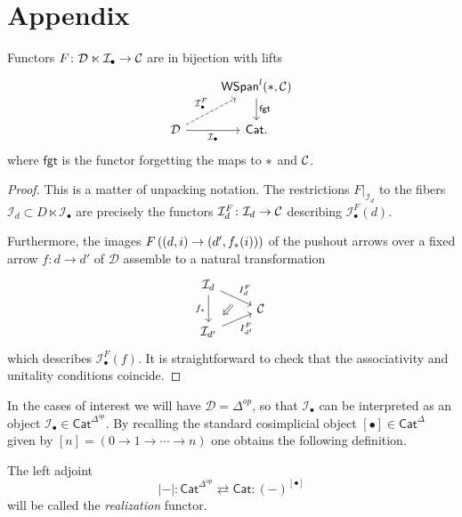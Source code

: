 \documentclass[a4paper,10pt]{article}%
\begin{document}
\appendix
\section{Appendix}


\begin{lemma}\label{SIMPSPANREIN LEMMA}
Functors $F \colon \mathcal{D} \ltimes \mathcal{I}_{\bullet} \to \mathcal{C}$ are in bijection with lifts
\[
\begin{tikzcd}
    & \mathsf{WSpan}^l(\**,\C) \ar{d}{\mathsf{fgt}} \\
\mathcal{D} \ar{r}[swap]{\mathcal{I}_{\bullet}} \ar[dashed]{ru}{\mathcal{I}_{\bullet}^F} & \mathsf{Cat}.
\end{tikzcd}
\]
where $\mathsf{fgt}$ is the functor forgetting the maps to $\**$ and $\mathcal{C}$.
\end{lemma}


\begin{proof}
	This is a matter of unpacking notation. The restrictions 
	$F|_{\mathcal{I}_d}$ to the fibers 
	$\mathcal{I}_d \subset D \ltimes \mathcal{I}_{\bullet}$
	are precisely the functors 
	$\mathcal{I}^F_d \colon \mathcal{I}_d \to \mathcal{C}$ describing $\mathcal{I}_{\bullet}^F(d)$.
	
	Furthermore, the images
	$F \left( (d,i) \to (d',f_{\**}(i)) \right)$	
	of the pushout arrows over a fixed arrow $f \colon d \to d'$ of $\mathcal{D}$
assemble to a natural transformation 
\begin{equation}
	\begin{tikzcd}[row sep=0.4em]
		\mathcal{I}_d 
		\ar{dr}[name=F1]{I_d^F} \ar{dd}[swap]{f_{\**}} &
	\\
 & \C 
	\\
|[alias=G2]| \mathcal{I}_{d'}  \ar{ur}[swap]{I_{d'}^F} & 
		\arrow[Rightarrow, from=F1, to=G2,shorten >=0.25cm,shorten <=0.25cm]
	\end{tikzcd}
\end{equation}
which describes $\mathcal{I}_{\bullet}^F(f)$. It is straightforward to check that the associativity and unitality conditions coincide.
\end{proof}


In the cases of interest we will have $\mathcal{D}=\Delta^{op}$,
so that $\mathcal{I}_{\bullet}$ can be interpreted as an object $\mathcal{I}_{\bullet} \in \mathsf{Cat}^{\Delta^{op}}$.
By recalling the standard cosimplicial object
$[\bullet] \in \mathsf{Cat}^{\Delta}$ given by 
$[n]=(0 \to 1 \to \cdots \to n)$
one obtains the following definition.


\begin{definition}
	The left adjoint
	\[
	|\minus|\colon
	\mathsf{Cat}^{\Delta^{op}} 
		\rightleftarrows
	\mathsf{Cat} 
	\colon (\minus)^{[\bullet]}
	\]
	will be called the \textit{realization} functor.
\end{definition}
\end{document}

